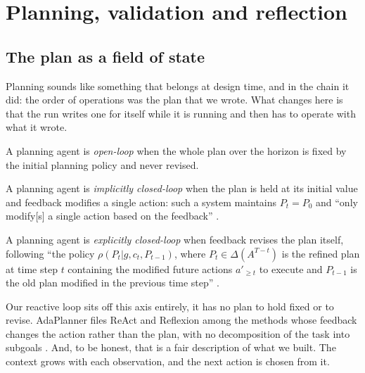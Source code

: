 \section{Planning, validation and reflection}
\label{sec:planning}

\subsection{The plan as a field of state}
\label{sec:planning-plan}

Planning sounds like something that belongs at design time, and in the chain it did: the order of
operations was the plan that we wrote. What changes here is that the run writes one for itself
while it is running and then has to operate with what it wrote.

\begin{definition}
\label{def:open-loop}
A planning agent is \emph{open-loop} when the whole plan over the horizon is fixed by the initial 
planning policy and never revised.
\end{definition}

\begin{definition}
\label{def:implicit-closed-loop}
A planning agent is \emph{implicitly closed-loop} when the plan is held at its 
initial value and feedback modifies a single action: such a system maintains 
$P_t = P_0$ and ``only modify[s] a single action based on the feedback'' \citep[\S2]{sun2023adaplanner}. 
\end{definition}

\begin{definition}
\label{def:closed-loop}
A planning agent is \emph{explicitly closed-loop} when feedback revises the plan itself, 
following ``the policy $\rho(P_t|g, c_t, P_{t-1})$, where $P_t \in \Delta(A^{T-t})$ is the refined plan 
at time step $t$ containing the modified future actions $a'_{\geq t}$ to execute and $P_{t-1}$ is the 
old plan modified in the previous time step'' \citep[\S2]{sun2023adaplanner}.
\end{definition}

Our reactive loop sits off this axis entirely, it has no plan to hold fixed or to revise. AdaPlanner
files ReAct and Reflexion among the methods whose feedback changes the action rather than the plan,
with no decomposition of the task into subgoals \citep[Table~1]{sun2023adaplanner}. And, to
be honest, that is a fair description of what we built. The context grows with each observation, 
and the next action is chosen from it.

